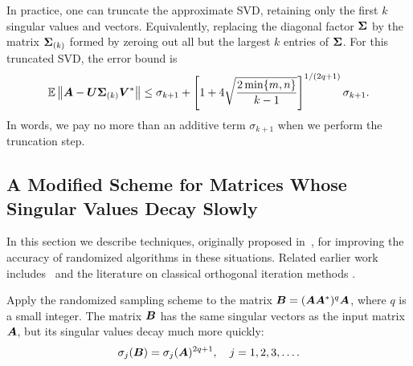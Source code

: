 \documentclass[12pt]{article}
\begin{document}
In practice, one can truncate the approximate SVD, retaining only the
first $k$ singular values and vectors.  Equivalently,
replacing the diagonal factor $\bm{\Sigma}$ by the matrix
$\bm{\Sigma}_{(k)}$ formed by zeroing out all but the
largest $k$ entries of $\bm{\Sigma}$.  For this truncated SVD, the error bound is
\begin{equation} \label{eqn:pca_trunc}
\operatorname{\mathbb{E}} \left\Vert { \bm{A} - \bm{U} \bm{\Sigma}_{(k)} \bm{V}^*} \right\Vert
	\leq \sigma_{k+1} + \left[ 1 + 4 \sqrt{\frac{2\min\{m,n\}}{k-1}} \right]^{1/(2q+1)} \sigma_{k+1}.
\end{equation}
 In words, we pay no more than an additive term $\sigma_{k+1}$ when we
perform the truncation step.  


\subsection{A Modified Scheme for Matrices Whose Singular Values Decay Slowly}
\label{sec:powerscheme}

In this section we describe techniques,
originally proposed in~\cite{tygert_szlam}, for improving the accuracy
of randomized algorithms in these situations.
Related earlier work includes~\cite{roweis} and the literature on
classical orthogonal iteration methods \cite[p.~332]{golub}.

 Apply the randomized sampling scheme \cite[\S 4]{RM}
to the matrix $\bm{B} = (\bm{A}\bm{A}^*)^q \bm{A}$, where $q$ is a
small integer.  The matrix $\bm{B}$ has the same singular vectors as
the input matrix $\bm{A}$, but its singular values decay much more quickly:
\begin{equation}
\label{eq:svds_of_B}
\sigma_j( \bm{B} ) = \sigma_j( \bm{A} )^{2q+1},
\quad j = 1, 2, 3, \dots.
\end{equation}
\end{document}
